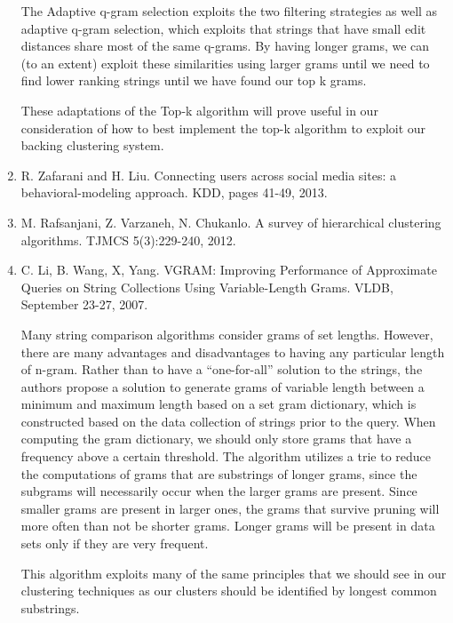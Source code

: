\documentclass[pdftex,12pt,letter]{article}
\begin{document}
\begin{enumerate}
	The Adaptive q-gram selection exploits the two filtering strategies as well as adaptive q-gram selection, which exploits that strings that have small edit distances share most of the same q-grams. By having longer grams, we can (to an extent) exploit these similarities using larger grams until we need to find lower ranking strings until we have found our top k grams. 

	These adaptations of the Top-k algorithm will prove useful in our consideration of how to best implement the top-k algorithm to exploit our backing clustering system. 


\item R. Zafarani and H. Liu. Connecting users across social media sites: a behavioral-modeling approach. KDD, pages 41-49, 2013.
\item M. Rafsanjani, Z. Varzaneh, N. Chukanlo. A survey of hierarchical clustering algorithms. TJMCS 5(3):229-240, 2012.
\item C. Li, B. Wang, X, Yang. VGRAM: Improving Performance of Approximate Queries on String Collections Using Variable-Length Grams. VLDB, September 23-27, 2007.

	Many string comparison algorithms consider grams of set lengths. However, there are many advantages and disadvantages to having any particular length of n-gram. Rather than to have a “one-for-all” solution to the strings, the authors propose a solution to generate grams of variable length between a minimum and maximum length based on a set gram dictionary, which is constructed based on the data collection of strings prior to the query. When computing the gram dictionary, we should only store grams that have a frequency above a certain threshold. The algorithm utilizes a trie to reduce the computations of grams that are substrings of longer grams, since the subgrams will necessarily occur when the larger grams are present. Since smaller grams are present in larger ones, the grams that survive pruning will more often than not be shorter grams. Longer grams will be present in data sets only if they are very frequent. 

	This algorithm exploits many of the same principles that we should see in our clustering techniques as our clusters should be identified by longest common substrings. 





\end{enumerate}
\FloatBarrier
\end{document}
